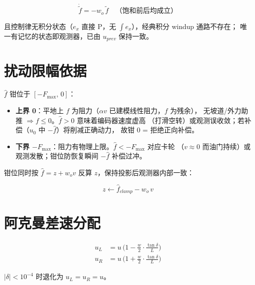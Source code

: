 \documentclass[11pt,a4paper]{article}
\begin{document}
\begin{equation}
\dot{\tilde f} = -w_o\,\tilde f \quad \text{（饱和前后均成立）}
\end{equation}

且控制律无积分状态（$e_x$ 直接 P，无 $\int e_x$），经典积分 windup 通路不存在；
唯一有记忆的状态即观测器，已由 $u_{prev}$ 保持一致。

\section{扰动限幅依据}

$\hat f$ 钳位于 $[-F_{\max},\,0]$：

\begin{itemize}
\item \textbf{上界 0}：平地上 $f$ 为阻力（$\alpha v$ 已建模线性阻力，$f$ 为残余），
  无坡道/外力助推 $\Rightarrow f \le 0$。$\hat f > 0$ 意味着编码器速度虚高
  （打滑空转）或观测误收敛；若补偿（$u_0$ 中 $-\hat f$）将削减正确动力，
  故钳 0 = 拒绝正向补偿。
\item \textbf{下界 $-F_{\max}$}：阻力有物理上限。$\hat f < -F_{\max}$ 对应卡轮
  （$v\approx 0$ 而油门持续）或观测发散；钳位防恢复瞬间 $-\hat f$ 补偿过冲。
\end{itemize}

钳位同时按 $\hat f = z + w_o v$ 反算 $z$，保持投影后观测器内部一致：

\begin{equation}
z \leftarrow \hat f_{clamp} - w_o\,v
\end{equation}

\section{阿克曼差速分配}

\begin{align}
u_L &= u\,\Big(1 - \frac{w}{2}\cdot\frac{\tan\delta}{L}\Big) \\
u_R &= u\,\Big(1 + \frac{w}{2}\cdot\frac{\tan\delta}{L}\Big)
\end{align}

$|\delta| < 10^{-4}$ 时退化为 $u_L = u_R = u$。
\end{document}
